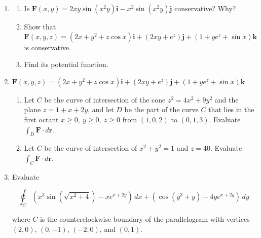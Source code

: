 \documentclass[a4paper, 12pt]{article}
\renewcommand{\headrulewidth}{0pt}
\begin{document}
\begin{enumerate}[leftmargin=*,label=\textbf{\arabic*.}]
\item \begin{enumerate}[leftmargin=*,label=\textbf{\alph*.}]
\item Is $\mathbf{F}(x,y)=2xy\sin\left(x^2y\right)\mathbf{i}-x^2\sin\left(x^2y\right)\mathbf{j}$ conservative? Why?
\item Show that
\[\mathbf{F}(x,y,z)=\left(2x+y^2+z\cos x\right)\mathbf{i}+\left(2xy+{e}^z\right)\mathbf{j}+\left(1+y{e}^z+\sin x\right)\mathbf{k}\]
is conservative.
\item Find its potential function.
\end{enumerate}

\newpage

\item $\mathbf{F}(x,y,z)=\left(2x+y^2+z\cos x\right)\mathbf{i}+\left(2xy+{e}^z\right)\mathbf{j}+\left(1+y{e}^z+\sin x\right)\mathbf{k}$

\begin{enumerate}[leftmargin=*,label=\textbf{\alph*.}]
\item Let $C $ be the curve of intersection of the cone $z^2=4x^2+9y^2$ and the plane $z=1+x+2y$, and let $D$ be the part of the curve $C$ that lies in the first octant $x\geq0,\:y\geq0,\:z\geq0$ from $(1,0,2)$ to $(0,1,3)$. Evaluate $\int_D\mathbf{F}\cdot d\mathbf{r}$.

\item Let $C$ be the curve of intersection of $x^2+y^2=1$ and $z=40$. Evaluate $\int_C\mathbf{F}\cdot d\mathbf{r}$.
\end{enumerate}

\item Evaluate

\[\oint_C\left(x^3\sin\left(\sqrt{x^2+4}\right)-x{e}^{x+2y}\right)\,dx + \left(\cos\left(y^3+y\right)-4y{e}^{x+2y}\right)\,dy\]

where $C$ is the counterclockwise boundary of the parallelogram with vertices $(2,0)$, $(0,-1)$, $(-2,0)$, and $(0,1)$.
\end{enumerate}

\newpage
\pagestyle{fancy}
\renewcommand{\headrulewidth}{1pt}

\end{document}
